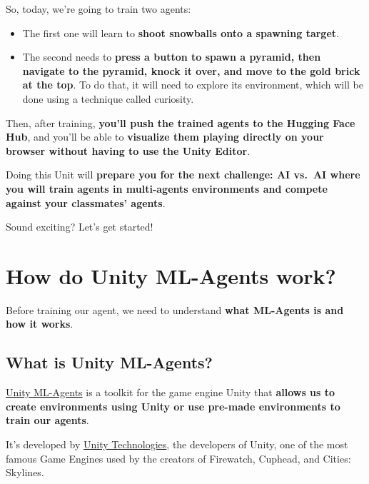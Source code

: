 \documentclass[11pt,a4paper]{article}
\begin{document}
So, today, we're going to train two agents:

\begin{itemize}
\tightlist
\item
  The first one will learn to \textbf{shoot snowballs onto a spawning target}.
\item
  The second needs to \textbf{press a button to spawn a pyramid, then navigate to the pyramid, knock it over, and move to the gold brick at the top}. To do that, it will need to explore its environment, which will be done using a technique called curiosity.
\end{itemize}


Then, after training, \textbf{you'll push the trained agents to the Hugging Face Hub}, and you'll be able to \textbf{visualize them playing directly on your browser without having to use the Unity Editor}.

Doing this Unit will \textbf{prepare you for the next challenge: AI vs.~AI where you will train agents in multi-agents environments and compete against your classmates' agents}.

Sound exciting? Let's get started!

\section{How do Unity ML-Agents work?}\label{how-do-unity-ml-agents-work}

Before training our agent, we need to understand \textbf{what ML-Agents is and how it works}.

\subsection{What is Unity ML-Agents?}\label{what-is-unity-ml-agents}

\href{https://github.com/Unity-Technologies/ml-agents}{Unity ML-Agents} is a toolkit for the game engine Unity that \textbf{allows us to create environments using Unity or use pre-made environments to train our agents}.

It's developed by \href{https://unity.com/}{Unity Technologies}, the developers of Unity, one of the most famous Game Engines used by the creators of Firewatch, Cuphead, and Cities: Skylines.
\end{document}
